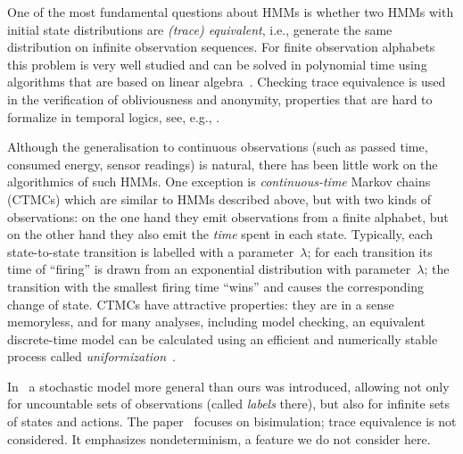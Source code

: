\documentclass[a4paper,UKenglish,cleveref, autoref,mathscr, amsthm, thmtools, thm-restate]{lipics-v2019}
\newcommand{\1}{\mathbb{I}}
\begin{document}
One of the most fundamental questions about HMMs is whether two HMMs with initial state distributions are \emph{(trace) equivalent}, i.e., generate the same distribution on infinite observation sequences.
For finite observation alphabets this problem is very well studied and can be solved in polynomial time using algorithms that are based on linear algebra~\cite{schut61,Paz71,Tzeng92,CortesMRdistance}.
Checking trace equivalence is used in the verification of obliviousness and anonymity, properties that are hard to formalize in temporal logics, see, e.g., \cite{EquivForSecurity10,kief11,ModVerif17}.

Although the generalisation to continuous observations (such as passed time, consumed energy, sensor readings) is natural, there has been little work on the algorithmics of such HMMs.
One exception is \emph{continuous-time} Markov chains (CTMCs) \cite{BHHK03,CDKM11} which are similar to HMMs described above, but with two kinds of observations: on the one hand they emit observations from a finite alphabet, but on the other hand they also emit the \emph{time} spent in each state. Typically, each state-to-state transition is labelled with a parameter~$\lambda$; for each transition its time of ``firing'' is drawn from an exponential distribution with parameter~$\lambda$; the transition with the smallest firing time ``wins'' and causes the corresponding change of state.
CTMCs have attractive properties: they are in a sense memoryless, and for many analyses, including model checking, an equivalent discrete-time model can be calculated using an efficient and numerically stable process called \emph{uniformization}~\cite{Grassmann91}.

In~\cite{HKK14} a stochastic model more general than ours was introduced, allowing not only for uncountable sets of observations (called \emph{labels} there), but also for infinite sets of states and actions.
The paper~\cite{HKK14} focuses on bisimulation; trace equivalence is not considered.
It emphasizes nondeterminism, a feature we do not consider here.
\end{document}
